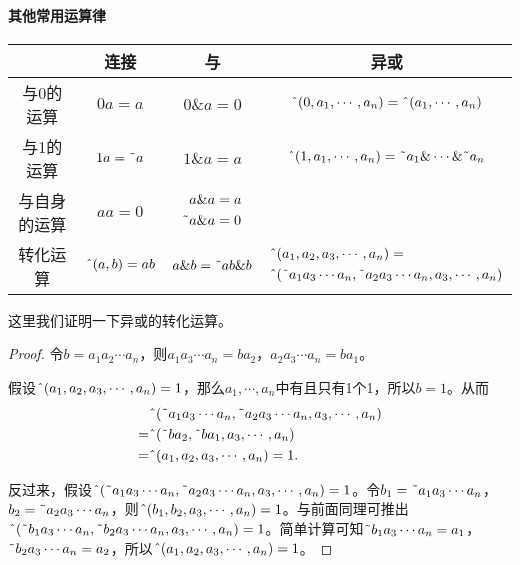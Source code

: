 \paragraph*{其他常用运算律}
\begin{center}
\begin{tabular}{|c|c|c|c|}
\hline
&连接&与&异或\\\hline
与0的运算&$0a=a$&$0\&a=0$&$\textrm{\^{}}(0,a_1,\cdots,a_n)=\textrm{\^{}}(a_1,\cdots,a_n)$\\\hline
与1的运算&$1a=\textrm{\~{}} a$&$1\&a=a$&$\textrm{\^{}}(1,a_1,\cdots,a_n)=\textrm{\~{}} a_1\&\cdots\&\textrm{\~{}} a_n$\\\hline
与自身的运算&$aa=0$&$\begin{aligned}a\& a&=a\\\textrm{\~{}} a\& a&=0\end{aligned}$&\\\hline
转化运算&$\textrm{\^{}}(a,b)=ab$&$a\&b=\textrm{\~{}} ab\&b$&$\begin{aligned}[]&\textrm{\^{}}(a_1,a_2,a_3,\cdots,a_n)=\\&\textrm{\^{}}(\textrm{\~{}} a_1a_3\cdots a_n,\textrm{\~{}} a_2a_3\cdots a_n,a_3,\cdots,a_n)\end{aligned}$\\\hline
\end{tabular}
\end{center}

这里我们证明一下异或的转化运算。
\begin{proof}
令$b=a_1a_2\cdots a_n$，则$a_1a_3\cdots a_n=ba_2$，$a_2a_3\cdots a_n=ba_1$。

假设$\textrm{\^{}}(a_1,a_2,a_3,\cdots,a_n)=1$，那么$a_1,\cdots,a_n$中有且只有1个1，所以$b=1$。从而
\[\begin{split}
&\textrm{\^{}}(\textrm{\~{}} a_1a_3\cdots a_n,\textrm{\~{}} a_2a_3\cdots a_n,a_3,\cdots,a_n)\\
=&\textrm{\^{}}(\textrm{\~{}}ba_2,\textrm{\~{}}ba_1,a_3,\cdots,a_n)\\
=&\textrm{\^{}}(a_1,a_2,a_3,\cdots,a_n)=1.
\end{split}\]

反过来，假设$\textrm{\^{}}(\textrm{\~{}} a_1a_3\cdots a_n,\textrm{\~{}} a_2a_3\cdots a_n,a_3,\cdots,a_n)=1$。令$b_1=\textrm{\~{}} a_1a_3\cdots a_n$，$b_2=\textrm{\~{}} a_2a_3\cdots a_n$，则$\textrm{\^{}}(b_1,b_2,a_3,\cdots,a_n)=1$。与前面同理可推出$\textrm{\^{}}(\textrm{\~{}} b_1a_3\cdots a_n,\textrm{\~{}} b_2a_3\cdots a_n,a_3,\cdots,a_n)=1$。简单计算可知$\textrm{\~{}} b_1a_3\cdots a_n=a_1$，$\textrm{\~{}} b_2a_3\cdots a_n=a_2$，所以$\textrm{\^{}}(a_1,a_2,a_3,\cdots,a_n)=1$。
\end{proof}


